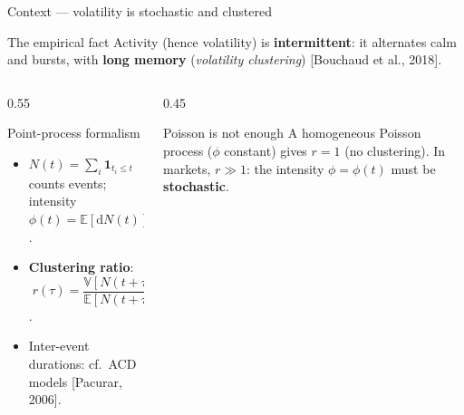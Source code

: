 \documentclass[aspectratio=169]{beamer}
\newcommand{\cit}[1]{{\footnotesize\color{mcmPrimary}[#1]}}
\begin{document}
\begin{frame}{Context — volatility is stochastic and clustered}
  \begin{block}{The empirical fact}
    Activity (hence volatility) is \textbf{intermittent}: it alternates calm and bursts, with \textbf{long memory} (\emph{volatility clustering}) \cit{Bouchaud et al., 2018}.
  \end{block}
  \begin{columns}[T]
    \begin{column}{0.55\textwidth}
      \begin{block}{Point-process formalism}
        \begin{itemize}
          \item $N(t)=\sum_i \mathbf{1}_{t_i\le t}$ counts events; intensity $\phi(t)=\mathbb{E}[\mathrm{d}N(t)]/\mathrm{d}t$.
          \item \textbf{Clustering ratio}: $\;r(\tau)=\dfrac{\mathbb{V}[N(t{+}\tau){-}N(t)]}{\mathbb{E}[N(t{+}\tau){-}N(t)]}$.
          \item Inter-event durations: cf.\ ACD models \cit{Pacurar, 2006}.
        \end{itemize}
      \end{block}
    \end{column}
    \begin{column}{0.45\textwidth}
      \begin{alertblock}{Poisson is not enough}
        A homogeneous Poisson process ($\phi$ constant) gives $r=1$ (no clustering). In markets, $r\gg 1$: the intensity $\phi=\phi(t)$ must be \textbf{stochastic}.
      \end{alertblock}
    \end{column}
  \end{columns}
\end{frame}
\end{document}
